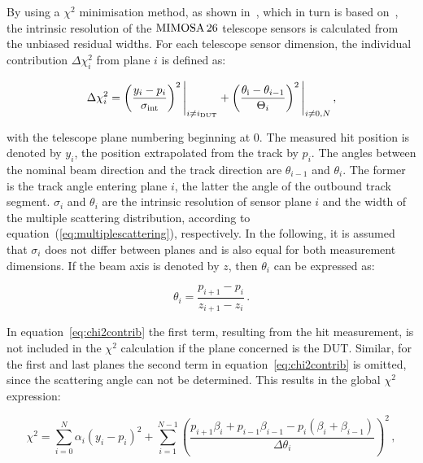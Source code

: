 By using a $\chi^{2}$ minimisation method, as shown in~\cite{ref:eudetreport200701}, which in turn is based on~\cite{ref:lutzpaper}, the intrinsic resolution of the $\textrm{MIMOSA\,26}$ telescope sensors is calculated from the unbiased residual widths. For each telescope sensor dimension, the individual contribution $\Delta \chi^2_{i}$ from plane $i$ is defined as:

\begin{equation}
\label{eq:chi2contrib}
\Delta \chi^2_{i} = \left( \frac{y_{i} - p_{i}}{\sigmai} \right)^2 \Bigg|_{i \ne i_{\textrm{DUT}}} +
\left( \frac{\theta_{\textrm{i}} - \theta_{i-1}}{\Theta_{i}} \right)^2 \Bigg|_{i \ne 0,N} \,,

\end{equation}

with the telescope plane numbering beginning at $0$.
The measured hit position is denoted by $y_{i}$, the position extrapolated from the track by $p_{i}$.
The angles between the nominal beam direction and the track direction are $\theta_{i-1}$ and $\theta_{i}$.
The former is the track angle entering plane $i$, the latter the angle of the outbound track segment.
$\sigma_{i}$ and $\theta_{i}$ are the intrinsic resolution of sensor plane $i$ and the width of the multiple scattering distribution, according to equation~(\ref{eq:multiplescattering}), respectively.
In the following, it is assumed that $\sigma_{i}$ does not differ between planes and is also equal for both measurement dimensions.
If the beam axis is denoted by $z$, then $\theta_i$ can be expressed as:

\begin{equation}
\theta_i = \frac{p_{i+1} - p_i}{z_{i+1} - z_i} \,.
\end{equation}


In equation~\ref{eq:chi2contrib} the first term, resulting from the hit measurement, is not included in the $\chi^2$ calculation if the plane concerned is the DUT.
Similar, for the first and last planes the second term in equation~\ref{eq:chi2contrib} is omitted, since the scattering angle can not be determined.
This results in the global $\chi^2$ expression:

\begin{equation}
\label{eq:globalchi2}
\chi^2 = \sum_{i=0}^{N} \alpha_i \left( y_i - p_i \right)^2 + \sum_{i=1}^{N-1}
\left( \frac{p_{i + 1} \beta_i + p_{i-1} \beta_{i-1} - p_i \left( \beta_i + \beta_{i-1} \right)}{\Delta \theta_i} \right)^2 \,,
\end{equation}

